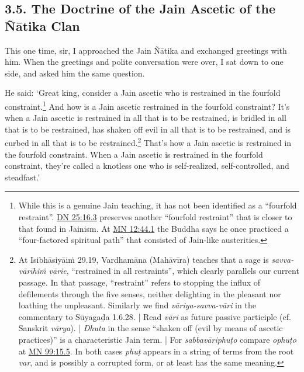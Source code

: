 \documentclass[12pt,openany]{book}%
\begin{document}
\subsection*{3.5. The Doctrine of the Jain Ascetic of the \textsanskrit{Ñātika} Clan }

This one time, sir, I approached the Jain \textsanskrit{Ñātika} and exchanged greetings with him. When the greetings and polite conversation were over, I sat down to one side, and asked him the same question. 

He said: ‘Great king, consider a Jain ascetic who is restrained in the fourfold constraint.\footnote{While this is a genuine Jain teaching, it has not been identified as a “fourfold restraint”. \href{https://suttacentral.net/dn25/en/sujato\#16.3}{DN 25:16.3} preserves another “fourfold restraint” that is closer to that found in Jainism. At \href{https://suttacentral.net/mn12/en/sujato\#44.1}{MN 12:44.1} the Buddha says he once practiced a “four-factored spiritual path” that consisted of Jain-like austerities. } And how is a Jain ascetic restrained in the fourfold constraint? It’s when a Jain ascetic is restrained in all that is to be restrained, is bridled in all that is to be restrained, has shaken off evil in all that is to be restrained, and is curbed in all that is to be restrained.\footnote{At \textsanskrit{Isibhāsiyāiṁ} 29.19, \textsanskrit{Vardhamāna} (\textsanskrit{Mahāvīra}) teaches that a sage is \textit{savva-\textsanskrit{vārīhiṁ} \textsanskrit{vārie}}, “restrained in all restraints”, which clearly parallels our current passage. In that passage, “restraint” refers to stopping the influx of defilements through the five senses, neither delighting in the pleasant nor loathing the unpleasant. Similarly we find \textit{\textsanskrit{vāriya}-savva-\textsanskrit{vāri}} in the commentary to \textsanskrit{Sūyagaḍa} 1.6.28. | Read \textit{\textsanskrit{vāri}} as future passive participle (cf. Sanskrit \textit{\textsanskrit{vārya}}). | \textit{Dhuta} in the sense “shaken off (evil by means of ascetic practices)” is a characteristic Jain term. | For \textit{\textsanskrit{sabbavāriphuṭo}} compare \textit{\textsanskrit{ophuṭo}} at \href{https://suttacentral.net/mn99/en/sujato\#15.5}{MN 99:15.5}. In both cases \textit{\textsanskrit{phuṭ}} appears in a string of terms from the root \textit{var}, and is possibly a corrupted form, or at least has the same meaning. } That’s how a Jain ascetic is restrained in the fourfold constraint. When a Jain ascetic is restrained in the fourfold constraint, they’re called a knotless one who is self-realized, self-controlled, and steadfast.’ 
\end{document}
